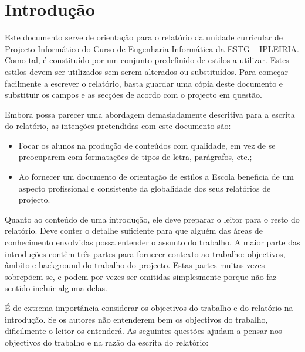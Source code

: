 
\chapter{Introdução}
\label{ch:introduction}


Este documento serve de orientação para o relatório da unidade curricular de Projecto Informático do Curso de Engenharia Informática da ESTG – IPLEIRIA. Como tal, é constituído por um conjunto predefinido de estilos a utilizar. Estes estilos devem ser utilizados sem serem alterados ou substituídos. Para começar facilmente a escrever o relatório, basta guardar uma cópia deste documento e substituir os campos e as secções de acordo com o projecto em questão.

Embora possa parecer uma abordagem demasiadamente descritiva para a escrita do relatório, as intenções pretendidas com este documento são:

\begin{itemize}
 \item Focar os alunos na produção de conteúdos com qualidade, em vez de se preocuparem com formatações de tipos de letra, parágrafos, etc.;
 \item Ao fornecer um documento de orientação de estilos a Escola beneficia de um aspecto profissional e consistente da globalidade dos seus relatórios de projecto.
\end{itemize}


Quanto ao conteúdo de uma introdução, ele deve preparar o leitor para o resto do relatório. Deve conter o detalhe suficiente para que alguém das áreas de conhecimento envolvidas possa entender o assunto do trabalho. A maior parte das introduções contêm três partes para fornecer contexto ao trabalho: objectivos, âmbito e background do trabalho do projecto. Estas partes muitas vezes sobrepõem-se, e podem por vezes ser omitidas simplesmente porque não faz sentido incluir alguma delas.

É de extrema importância considerar os objectivos do trabalho e do relatório na introdução. Se os autores não entenderem bem os objectivos do trabalho, dificilmente o leitor os entenderá. As seguintes questões ajudam a pensar nos objectivos do trabalho e na razão da escrita do relatório:

